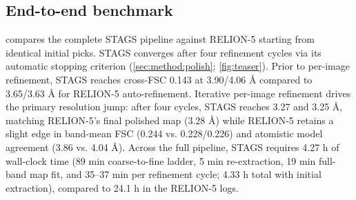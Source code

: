 \subsection{End-to-end benchmark}
\label{sec:results:benchmark}
 compares the complete STAGS pipeline against RELION-5 starting from identical initial picks. STAGS converges after four refinement cycles via its automatic stopping criterion (\cref{sec:method:polish}; \cref{fig:teaser}). Prior to per-image refinement, STAGS reaches cross-FSC 0.143 at 3.90/4.06 Å compared to 3.65/3.63 Å for RELION-5 auto-refinement. Iterative per-image refinement drives the primary resolution jump: after four cycles, STAGS reaches 3.27 and 3.25 Å, matching RELION-5's final polished map (3.28 Å) while RELION-5 retains a slight edge in band-mean FSC (0.244 vs. 0.228/0.226) and atomistic model agreement (3.86 vs. 4.04 Å). Across the full pipeline, STAGS requires 4.27 h of wall-clock time (89 min coarse-to-fine ladder, 5 min re-extraction, 19 min full-band map fit, and 35–37 min per refinement cycle; 4.33 h total with initial extraction), compared to 24.1 h in the RELION-5 logs.

